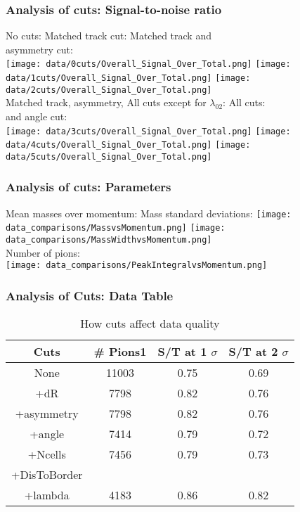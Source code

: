 \documentclass{beamer}
\begin{document}
\frame
{
\frametitle{Analysis of cuts: Signal-to-noise ratio}
No cuts:
\noindent\hspace{2.0 cm}Matched track cut:
\noindent\hspace{0.5 cm}Matched track and\\ 
\noindent\hspace{8.0 cm}asymmetry cut:\\
\texttt{[image: data/0cuts/Overall\_Signal\_Over\_Total.png]}
\texttt{[image: data/1cuts/Overall\_Signal\_Over\_Total.png]}
\texttt{[image: data/2cuts/Overall\_Signal\_Over\_Total.png]}\\
Matched track, asymmetry, 
All cuts except for $\lambda_{02}$:
\noindent\hspace{1.0 cm}All cuts:\\
and angle cut:\\
\texttt{[image: data/3cuts/Overall\_Signal\_Over\_Total.png]}
\texttt{[image: data/4cuts/Overall\_Signal\_Over\_Total.png]}
\texttt{[image: data/5cuts/Overall\_Signal\_Over\_Total.png]}
}

\frame
{
\frametitle{Analysis of cuts: Parameters}
Mean masses over momentum: 
\noindent\hspace{1.0 cm} Mass standard deviations:
\texttt{[image: data\_comparisons/MassvsMomentum.png]}
\texttt{[image: data\_comparisons/MassWidthvsMomentum.png]}\\
Number of pions:\\
\texttt{[image: data\_comparisons/PeakIntegralvsMomentum.png]}\\
}

\frame
{
\frametitle{Analysis of Cuts: Data Table}
\begin{table}
\caption{How cuts affect data quality}
\centering
\begin{tabular}{c c c c}
\hline\hline
Cuts & \# Pions1 & S/T at 1 $\sigma$ &  S/T at 2 $\sigma$ \\ [0.5ex] %
\hline
None & 11003& 0.75 & 0.69 \\
+dR & 7798 & 0.82 & 0.76 \\
+asymmetry & 7798 & 0.82 & 0.76 \\
+angle& 7414 & 0.79 & 0.72 \\
+Ncells & 7456 & 0.79 & 0.73 \\
+DisToBorder & & & \\
+lambda & 4183 & 0.86 & 0.82 \\ [1ex]
\hline
\end{tabular}
\label{table:nonlin}
\end{table}
}
\end{document}
